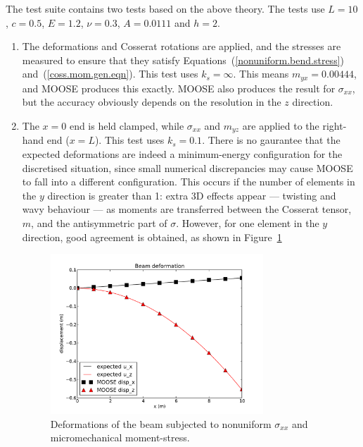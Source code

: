 \documentclass[]{scrreprt}
\begin{document}
The test suite contains two tests based on the above theory.  The
tests use $L=10$, $c=0.5$, $E=1.2$, $\nu=0.3$, $A=0.0111$ and $h=2$.
\begin{enumerate}
\item The deformations and Cosserat rotations are applied, and the
  stresses are measured to ensure that they satisfy
  Equations~(\ref{nonuniform.bend.stress})
  and~(\ref{coss.mom.gen.eqn}).  This test uses $k_{s}=\infty$.  This
  means $m_{yx}=0.00444$, and MOOSE produces this exactly.  MOOSE also
  produces the result for $\sigma_{xx}$, but the accuracy obviously
  depends on the resolution in the $z$ direction.

\item The $x=0$ end is held clamped, while $\sigma_{xx}$ and $m_{yz}$
  are applied to the right-hand end ($x=L$).  This test uses
  $k_{s}=0.1$.  There is no gaurantee that the expected deformations
  are indeed a minimum-energy configuration for the discretised
  situation, since small numerical discrepancies may cause MOOSE to
  fall into a different configuration.  This occurs if the number of
  elements in the $y$ direction is greater than 1: extra 3D effects appear
  --- twisting and wavy behaviour --- as moments are transferred
  between the Cosserat tensor, $m$, and the antisymmetric part of
  $\sigma$.  However, for one element in the $y$ direction, good
  agreement is obtained, as shown in Figure~\ref{beam2.fig}
\begin{figure}[htb]
\begin{center}
\includegraphics[width=8cm]{cosserat_beam_disp_2.pdf}
\caption{Deformations of the beam subjected to nonuniform
  $\sigma_{xx}$ and micromechanical moment-stress.}
\label{beam2.fig}
\end{center}
\end{figure}

\end{enumerate}
\end{document}
